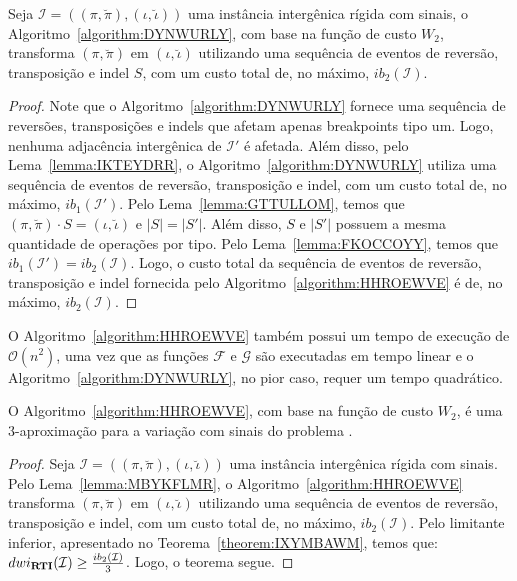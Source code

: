 \begin{lemma}\label{lemma:MBYKFLMR}
Seja $\mathcal{I} = ((\pi,\breve\pi),(\iota,\breve\iota))$ uma instância intergênica rígida com sinais, o Algoritmo~\ref{algorithm:DYNWURLY}, com base na função de custo $W_2$, transforma $(\pi,\breve\pi)$ em $(\iota,\breve\iota)$ utilizando uma sequência de eventos de reversão, transposição e indel $S$, com um custo total de, no máximo, $ib_2(\mathcal{I})$.
\end{lemma}
\begin{proof}
Note que o Algoritmo~\ref{algorithm:DYNWURLY} fornece uma sequência de reversões, transposições e indels que afetam apenas breakpoints tipo um. Logo, nenhuma adjacência intergênica de $\mathcal{I'}$ é afetada. Além disso, pelo Lema~\ref{lemma:IKTEYDRR}, o Algoritmo~\ref{algorithm:DYNWURLY} utiliza uma sequência de eventos de reversão, transposição e indel, com um custo total de, no máximo, $ib_1(\mathcal{I'})$. Pelo Lema~\ref{lemma:GTTULLOM}, temos que $(\pi,\breve\pi) \cdot S = (\iota,\breve\iota)$ e $|S| = |S'|$. Além disso, $S$ e $|S'|$ possuem a mesma quantidade de operações por tipo. Pelo Lema~\ref{lemma:FKOCCOYY}, temos que $ib_1(\mathcal{I'}) = ib_2(\mathcal{I})$. Logo, o custo total da sequência de eventos de reversão, transposição e indel fornecida pelo Algoritmo~\ref{algorithm:HHROEWVE} é de, no máximo, $ib_2(\mathcal{I})$.
\end{proof}

O Algoritmo~\ref{algorithm:HHROEWVE} também possui um tempo de execução de $\mathcal{O}(n^2)$, uma vez que as funções $\mathcal{F}$ e $\mathcal{G}$ são executadas em tempo linear e o Algoritmo~\ref{algorithm:DYNWURLY}, no pior caso, requer um tempo quadrático.

\begin{theorem}\label{theorem:MJXOZGOO}
O Algoritmo~\ref{algorithm:HHROEWVE}, com base na função de custo $W_2$, é uma $3$-aproximação para a variação com sinais do problema \SbWIRTI{}.
\end{theorem}
\begin{proof}
Seja $\mathcal{I} = ((\pi,\breve\pi),(\iota,\breve\iota))$ uma instância intergênica rígida com sinais. Pelo Lema~\ref{lemma:MBYKFLMR}, o Algoritmo~\ref{algorithm:HHROEWVE} transforma $(\pi,\breve\pi)$ em $(\iota,\breve\iota)$ utilizando uma sequência de eventos de reversão, transposição e indel, com um custo total de, no máximo, $ib_2(\mathcal{I})$. Pelo limitante inferior, apresentado no Teorema~\ref{theorem:IXYMBAWM}, temos que: $dwi_{\textbf{RTI}}(\mathcal{I}) \ge \frac{ib_2(\mathcal{I})}{3}$. Logo, o teorema segue.
\end{proof}

